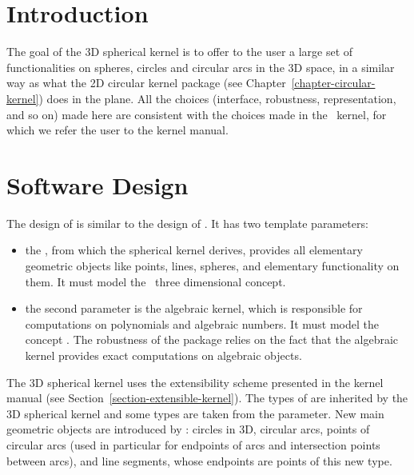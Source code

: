 \section{Introduction}

The goal of the 3D spherical kernel is to offer to the user a large set
of functionalities on spheres, circles and circular arcs in the 3D
space, in a similar way as what the 2D circular kernel package (see
Chapter~\ref{chapter-circular-kernel}) does in the plane. All the
choices (interface, robustness, representation, and so on) made here
are consistent with the choices made in the \cgal\ kernel, for which
we refer the user to the kernel manual.

\section{Software Design}

The design of  is similar to the design of
. It has two template parameters:
\begin{itemize}
\item {} the , from which the spherical kernel derives,
provides all elementary geometric objects like points, lines, spheres, and
elementary functionality on them. It must model the \cgal\ three 
dimensional  concept.
\item {} the second parameter is the algebraic kernel, which is 
responsible for computations on polynomials and algebraic numbers. It 
must model the concept . The
robustness of the package relies on the fact that the algebraic kernel
provides exact computations on algebraic objects.
\end{itemize}

The 3D spherical kernel uses the extensibility scheme presented in the 
kernel manual (see Section~\ref{section-extensible-kernel}). 
The types of  are inherited
by the 3D spherical kernel and some types are taken from the
 parameter. New main geometric objects are
introduced by : circles in 3D, circular arcs,
points of circular arcs (used in particular for endpoints of arcs and
intersection points between arcs), and line segments, whose endpoints
are points of this new type.

